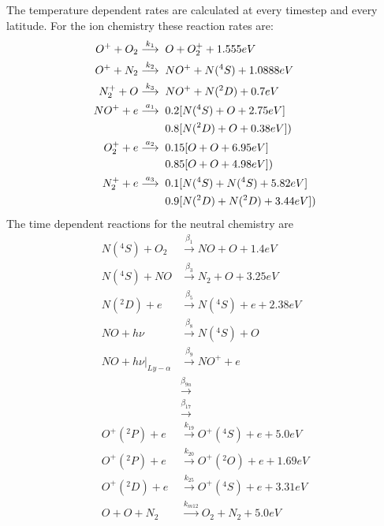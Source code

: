 %
The temperature dependent rates are calculated at every timestep and
every latitude. For the ion chemistry these reaction rates are:
%
\begin{align}
 O^+ + O_2  \stackrel{k_1}{\longrightarrow}& \;\; O + O_2^+ + 1.555 eV   \\
 O^+ + N_2  \stackrel{k_2}{\longrightarrow}& \;\;  NO^+ + N(^4S) + 1.0888 eV   \\
 N_2^+ + O  \stackrel{k_3}{\longrightarrow}& \;\;  NO^+ + N(^2D) + 0.7 eV   \\
 NO^+ + e \stackrel{a_1}{\longrightarrow}& \;\;  0.2 [N(^4S) + O + 2.75 eV]   \\
                     & \;\; 0.8 [N(^2D) + O + 0.38 eV]  ) \notag \\
 O_2^+ + e  \stackrel{a_2}{\longrightarrow}& \;\; 0.15 [O  + O + 6.95 eV]   \\
                     & \;\; 0.85 [O + O + 4.98 eV] ) \notag  \\
 N_2^+ + e  \stackrel{a_3}{\longrightarrow}& \;\; 0.1 [N(^4S) + N(^4S) + 5.82 eV]   \\
                    & \;\;  0.9 [N(^2D) + N(^2D) + 3.44 eV] ) \notag  \\
\end{align}
%
The time dependent reactions for the neutral chemistry are
%
\begin{align}
  N(^4S) + O_2& \stackrel{\beta_1}{\longrightarrow}  NO + O   + 1.4 eV   \\
  N(^4S) + NO & \stackrel{\beta_3}{\longrightarrow}  N_2 + O   + 3.25 eV   \\
  N(^2D) + e  & \stackrel{\beta_5}{\longrightarrow}  N(^4S) + e  + 2.38 eV   \\
  NO + h \nu  & \stackrel{\beta_8}{\longrightarrow}  N(^4S) + O    \\
  NO + h \nu |_{Ly-\alpha}& \stackrel{\beta_9}{\longrightarrow}  NO^+ + e    \\
  & \stackrel{\beta_{9n}}{\longrightarrow}      \\
  & \stackrel{\beta_{17}}{\longrightarrow}    \\
  O^+(^2P) + e  & \stackrel{k_{19}}{\longrightarrow}  O^+(^4S) + e  + 5.0 eV   \\
  O^+(^2P) + e  & \stackrel{k_{20}}{\longrightarrow}  O^+(^2O) + e  + 1.69 eV   \\
  O^+(^2D) + e  & \stackrel{k_{25}}{\longrightarrow}  O^+(^4S) + e  + 3.31 eV   \\
  O + O + N_2  & \stackrel{k_{m12}}{\longrightarrow}  O_2 + N_2  + 5.0 eV  
\end{align}
%
